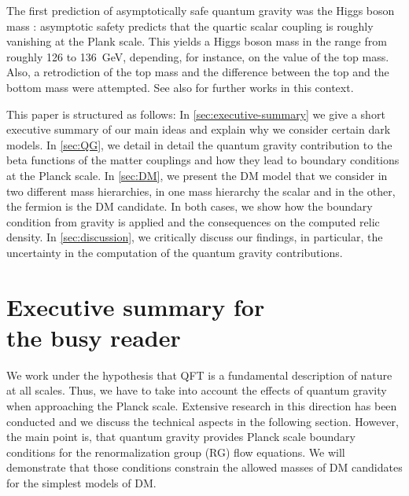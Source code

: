 \documentclass[aps,prd,twocolumn,preprintnumbers,superscriptaddress,nobibnotes,floatfix,longbibliography]{revtex4-1}
\begin{document}
The first prediction of asymptotically safe quantum gravity was the Higgs boson mass \cite{Shaposhnikov:2009pv}:
asymptotic safety predicts that the quartic scalar coupling is roughly vanishing at the Plank scale.
This yields a Higgs boson mass in the range from roughly 126 to 136\, GeV, depending, for instance, on the value of the top mass.
Also, a retrodiction of the top mass \cite{Eichhorn:2017ylw} and the difference between the top and the bottom mass \cite{Eichhorn:2018whv} were attempted.
See also \cite{1709.07252,1711.02949,1810.07615,1909.07318} for further works in this context.

This paper is structured as follows:
In \autoref{sec:executive-summary} we give a short executive summary of our main ideas and explain why we consider certain dark models.  
In \autoref{sec:QG}, we detail in detail the quantum gravity contribution to the beta functions of the matter couplings and how they lead to boundary conditions at the Planck scale.
In \autoref{sec:DM}, we present the DM model that we consider in two different mass hierarchies, in one mass hierarchy the scalar and in the other, the fermion is the DM candidate. 
In both cases, we show how the boundary condition from gravity is applied and the consequences on the computed relic density.
In \autoref{sec:discussion}, we critically discuss our findings, in particular, the uncertainty in the computation of the quantum gravity contributions.

\section{Executive summary for\\ the busy reader}
\label{sec:executive-summary}
We work under the hypothesis that QFT is a fundamental description of nature at all scales.  Thus, we have to take into account the effects of quantum gravity when approaching the Planck scale. Extensive research in this direction has been conducted and we discuss the technical aspects in the following section. However, the main point is, that quantum gravity provides Planck scale boundary conditions for the renormalization group (RG) flow equations. We will demonstrate that those conditions constrain the allowed masses of DM candidates for the simplest models of DM. 
\end{document}
